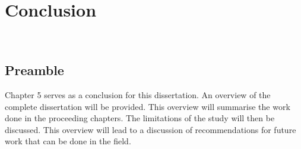 \chapter{Conclusion}
\vspace{38em}

\hrulefill
\\
\newpage
		\section{Preamble}
		Chapter 5 serves as a conclusion for this dissertation. An overview of the complete dissertation will be provided. This overview will summarise the work done in the proceeding chapters. The limitations of the study will then be discussed. This overview will lead to a discussion of recommendations for future work that can be done in the field.
